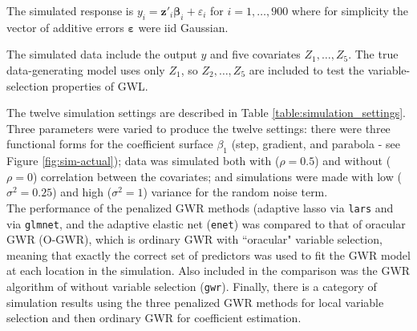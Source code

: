 \documentclass[authoryear, review, 11pt]{elsarticle}
\begin{document}
	The simulated response is $y_i = \bm{z}'_i \bm{\beta}_i + \varepsilon_i$ for $i=1, \dots, 900$ where for simplicity the vector of additive errors $\bm{\varepsilon}$ were iid Gaussian.%
	
	The simulated data include the output $y$ and five covariates $Z_1, \dots, Z_5$. The true data-generating model uses only $Z_1$, so $Z_2, \dots, Z_5$ are included to test the variable-selection properties of GWL.
	
	The twelve simulation settings are described in Table \ref{table:simulation_settings}. Three parameters were varied to produce the twelve settings: there were three functional forms for the coefficient surface $\beta_1$ (step, gradient, and parabola - see Figure \ref{fig:sim-actual}); data was simulated both with ($\rho = 0.5$) and without ($\rho = 0$) correlation between the covariates; and simulations were made with low ($\sigma^2 = 0.25$) and high ($\sigma^2 = 1$) variance for the random noise term.\\
	
	The performance of the penalized GWR methods (adaptive lasso via \verb!lars! and via \verb!glmnet!, and the adaptive elastic net (\verb!enet!) was compared to that of oracular GWR (O-GWR), which is ordinary GWR with ``oracular" variable selection, meaning that exactly the correct set of predictors was used to fit the GWR model at each location in the simulation. Also included in the comparison was the GWR algorithm of \cite{Fotheringham:2002} without variable selection (\verb!gwr!). Finally, there is a category of simulation results using the three penalized GWR methods for local variable selection and then ordinary GWR for coefficient estimation.\\
	
\end{document}
